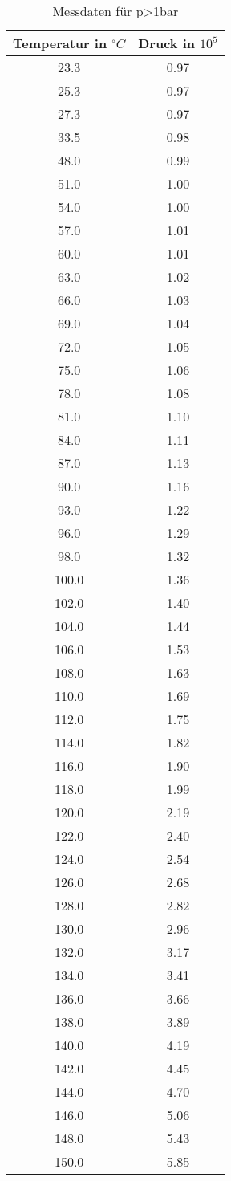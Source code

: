 \documentclass[
  captions=tableheading,
]{scrartcl}
\begin{document}
\begin{table}
  \centering
  \caption{Messdaten für p>1bar}

  \label{tab:Messdaten2}

\begin{tabular}{c c}

  \toprule

  {Temperatur in $^\circ C$}& {Druck in $10^5$}\\
\midrule
 23.3 & 0.97 \\
 25.3 & 0.97 \\
 27.3 & 0.97 \\
 33.5 & 0.98 \\
 48.0 & 0.99 \\
 51.0 & 1.00 \\
 54.0 & 1.00 \\
 57.0 & 1.01 \\
 60.0 & 1.01 \\
 63.0 & 1.02 \\
 66.0 & 1.03 \\
 69.0 & 1.04 \\
 72.0 & 1.05 \\
 75.0 & 1.06 \\
 78.0 & 1.08 \\
 81.0 & 1.10 \\
 84.0 & 1.11 \\
 87.0 & 1.13 \\
 90.0 & 1.16 \\
 93.0 & 1.22 \\
 96.0 & 1.29 \\
 98.0 & 1.32 \\
 100.0 & 1.36 \\
 102.0 & 1.40 \\
 104.0 & 1.44 \\
 106.0 & 1.53 \\
 108.0 & 1.63 \\
 110.0 & 1.69 \\
 112.0 & 1.75 \\
 114.0 & 1.82 \\
 116.0 & 1.90 \\
 118.0 & 1.99 \\
 120.0 & 2.19 \\
 122.0 & 2.40 \\
 124.0 & 2.54 \\
 126.0 & 2.68 \\
 128.0 & 2.82 \\
 130.0 & 2.96 \\
 132.0 & 3.17 \\
 134.0 & 3.41 \\
 136.0 & 3.66 \\
 138.0 & 3.89 \\
 140.0 & 4.19 \\
 142.0 & 4.45 \\
 144.0 & 4.70 \\
 146.0 & 5.06 \\
 148.0 & 5.43 \\
 150.0 & 5.85 \\
 \end {tabular}
 \end {table}
\end{document}
